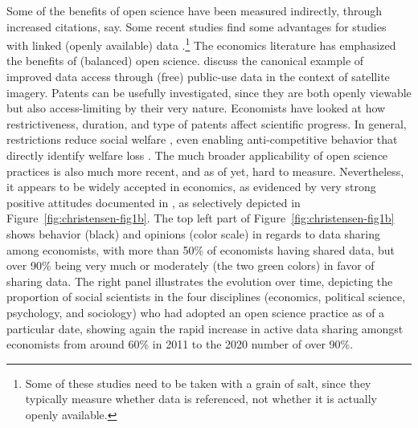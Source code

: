 \documentclass{article}
\begin{document}
Some of the  benefits of open science have  been measured indirectly, through increased citations, say. Some recent studies find some advantages for studies with linked (openly available) data \citep{piwowar_data_2013,colavizza_citation_2020,christensen_study_2019}.\footnote{Some of these studies need to be taken with a grain of salt, since they typically measure whether data is referenced, not whether it is actually openly available.} The economics literature has emphasized the benefits of (balanced) open science. \citet{nagaraj_improving_2020} discuss the canonical example of improved data access through (free) public-use data in the context of satellite imagery. Patents can be usefully investigated, since they are both openly viewable but also access-limiting by their very nature. Economists have looked at how restrictiveness, duration, and type of patents affect scientific progress. In general, restrictions reduce social welfare \citep{williams_intellectual_2013,murray_mice_2016}, even enabling anti-competitive behavior that directly identify welfare loss \citep{xie_anticompetitive_2020}. The much broader applicability of open science practices is also much more recent, and as of yet, hard to measure. Nevertheless, it appears to be widely accepted in economics, as evidenced by very strong positive attitudes documented in \citet{ferguson_survey_2023}, as selectively depicted in  Figure~\ref{fig:christensen-fig1b}. The top left part of Figure~\ref{fig:christensen-fig1b} shows behavior (black) and opinions (color scale) in regards to data sharing among economists, with more than 50\% of economists having shared data, but over 90\% being very much or moderately (the two green colors) in favor of sharing data. The right panel illustrates the evolution over time, depicting the proportion of social scientists in the four disciplines (economics, political science, psychology, and sociology) who had adopted an open science practice as of a particular date, showing again the rapid increase in active data sharing amongst economists from around 60\% in 2011 to the 2020 number of over 90\%.  
\end{document}
